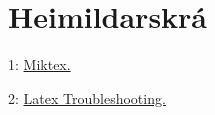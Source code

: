 \section{Heimildarskrá}


\begin{center}
1:
\href{https://miktex.org/}{Miktex.}

2:
\href{http://tex.stackexchange.com}{Latex Troubleshooting.} 

\end{center}